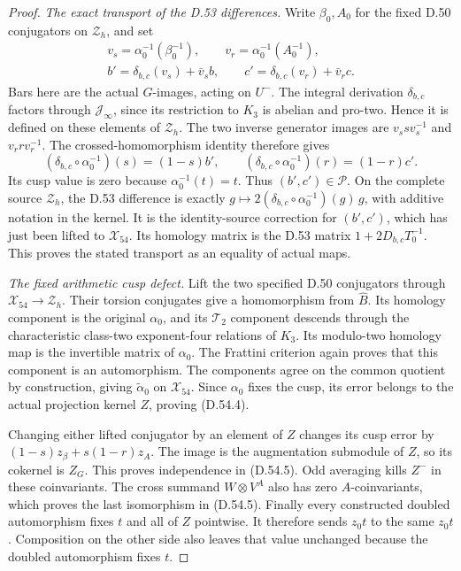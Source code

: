 \begin{proof}
\emph{The exact transport of the D.53 differences.}
Write \(\beta_0,A_0\) for the fixed
D.50 conjugators on \(\mathcal Z_h\), and set
\[
 \begin{gathered}
 v_s=\alpha_0^{-1}(\beta_0^{-1}),\qquad
 v_r=\alpha_0^{-1}(A_0^{-1}),\\
 b'=\delta_{b,c}(v_s)+\bar v_s b,\qquad
 c'=\delta_{b,c}(v_r)+\bar v_r c .
 \end{gathered}
 \tag{D.54.23}
\]
Bars here are the actual \(G\)-images,
acting on \(U^-\).
The integral derivation \(\delta_{b,c}\)
factors through \(\mathcal J_\infty\),
since its restriction to \(K_3\) is
abelian and pro-two. Hence it is
defined on these elements of \(\mathcal Z_h\).
The two inverse generator images are
\(v_s s v_s^{-1}\) and \(v_r r v_r^{-1}\).
The crossed-homomorphism identity
therefore gives
\[
 (\delta_{b,c}\circ\alpha_0^{-1})(s)=(1-s)b',
 \qquad
 (\delta_{b,c}\circ\alpha_0^{-1})(r)=(1-r)c'.
\]
Its cusp value is zero because
\(\alpha_0^{-1}(t)=t\).
Thus \((b',c')\in\mathscr P\).
On the complete source \(\mathcal Z_h\),
the D.53 difference is exactly
\(g\mapsto
  2(\delta_{b,c}\circ\alpha_0^{-1})(g)\,g\),
with additive notation in the kernel.
It is the identity-source correction
for \((b',c')\), which has just been
lifted to \(\mathcal X_{54}\).
Its homology matrix is the D.53
matrix \(1+2D_{b,c}T_0^{-1}\).
This proves the stated transport
as an equality of actual maps.

\emph{The fixed arithmetic cusp defect.}
Lift the two specified D.50 conjugators
through \(\mathcal X_{54}\to\mathcal Z_h\).
Their torsion conjugates give a homomorphism
from \(\widehat B\). Its homology component
is the original \(\alpha_0\), and its
\(\mathcal T_2\) component descends
through the characteristic class-two
exponent-four relations of \(K_3\).
Its modulo-two homology map is the
invertible matrix of \(\alpha_0\).
The Frattini criterion again proves
that this component is an automorphism.
The components agree on the common
quotient by construction, giving
\(\widetilde\alpha_0\) on \(\mathcal X_{54}\).
Since \(\alpha_0\) fixes the cusp,
its error belongs to the actual
projection kernel \(Z\), proving
(D.54.4).

Changing either lifted conjugator by
an element of \(Z\) changes its cusp
error by
\((1-s)z_\beta+s(1-r)z_A\).
The image is the augmentation submodule
of \(Z\), so its cokernel is \(Z_G\).
This proves independence in (D.54.5).
Odd averaging kills \(Z^-\) in these
coinvariants. The cross summand
\(W\otimes V^A\) also has zero
\(A\)-coinvariants, which proves the
last isomorphism in (D.54.5).
Finally every constructed doubled
automorphism fixes \(t\) and all of
\(Z\) pointwise. It therefore sends
\(z_0t\) to the same \(z_0t\).
Composition on the other side also
leaves that value unchanged because
the doubled automorphism fixes \(t\).


\end{proof}
